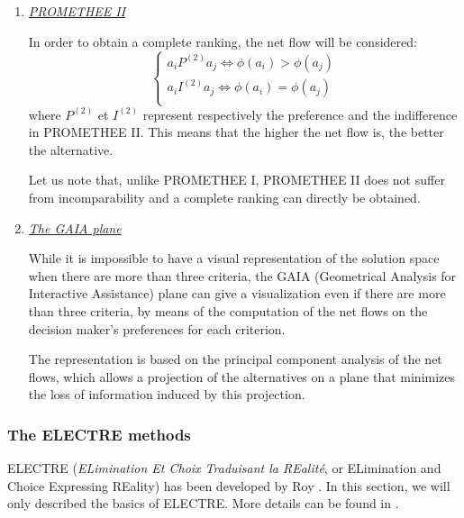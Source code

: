 \begin{enumerate}
\item \textit{\underline{PROMETHEE II}}

In order to obtain a complete ranking, the net flow will be considered:
\begin{equation}
\begin{cases}
a_iP^{(2)}a_j \Leftrightarrow \phi(a_i) > \phi(a_j)\\
a_iI^{(2)}a_j \Leftrightarrow \phi(a_i) = \phi(a_j)\\
\end{cases}
\end{equation}
where $P^{(2)}$ et $I^{(2)}$ represent respectively the preference and the indifference in PROMETHEE II. This means that the higher the net flow is, the better the alternative.

Let us note that, unlike PROMETHEE I, PROMETHEE II does not suffer from incomparability and a complete ranking can directly be obtained.

\item \textit{\underline{The GAIA plane}}

While it is impossible to have a visual representation of the solution space when there are more than three criteria, the GAIA (Geometrical Analysis for Interactive Assistance) plane can give a visualization even if there are more than three criteria, by means of the computation of the net flows on the decision maker's preferences for each criterion.

The representation is based on the principal component analysis of the net flows, which allows a projection of the alternatives on a plane that minimizes the loss of information induced by this projection.
\end{enumerate}

\subsubsection{The ELECTRE methods}
ELECTRE (\textit{ELimination Et Choix Traduisant la REalité}, or ELimination and Choice Expressing REality) has been developed by Roy \cite{Roy66}. In this section, we will only described the basics of ELECTRE. More details can be found in \cite{electre}.

